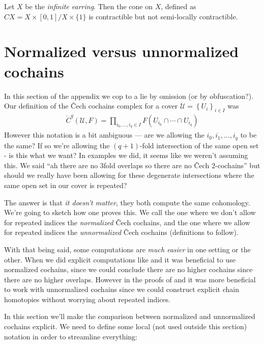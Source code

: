 \documentclass[11pt]{amsart}
\begin{document}
\begin{example} Let $X$ be the \emph{infinite earring}. Then the cone on $X$, defined as $CX = X \times [0,1] / X \times \{1\}$ is contractible but not semi-locally contractible.
\end{example}

\section{Normalized versus unnormalized cochains}

In this section of the appendix we cop to a lie by omission (or by obfuscation?). Our definition of the \v{C}ech cochains complex for a cover $\mathcal{U}=\left\{ U_i \right\}_{i\in I}$ was
\begin{align*}
    \check{C}^q(\mathcal{U},F) = \prod_{i_0, \ldots, i_q\in I} F(U_{i_0}\cap \cdots \cap U_{i_q})
\end{align*}
However this notation is a bit ambiguous --- are we allowing the $i_0,i_1, \ldots, i_q$ to be the same? If so we're allowing the $(q+1)$-fold intersection of the same open set - is this what we want? In examples we did, it seems like we weren't assuming this. We said ``ah there are no 3fold overlaps so there are no \v{C}ech 2-cochains'' but should we really have been allowing for these degenerate intersections where the same open set in our cover is repeated?

The answer is that \emph{it doesn't matter}, they both compute the same cohomology. We're going to sketch how one proves this. We call the one where we don't allow for repeated indices the \emph{normalized} \v{C}ech cochains, and the one where we allow for repeated indices the \emph{unnormalized} \v{C}ech cochains (definitions to follow).

With that being said, some computations are \emph{much easier} in one setting or the other. When we did explicit computations like  and  it was beneficial to use normalized cochains, since we could conclude there are no higher cochains since there are no higher overlaps. However in the proofs of  and  it was more beneficial to work with unnormalized cochains since we could construct explicit chain homotopies without worrying about repeated indices.

In this section we'll make the comparison between normalized and unnormalized cochains explicit. We need to define some local (not used outside this section) notation in order to streamline everything:
\end{document}
